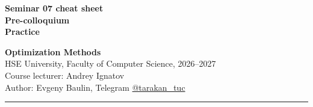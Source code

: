\documentclass[10pt,a4paper]{article}
\begin{document}
\thispagestyle{fancy}

\noindent
\begin{minipage}[b]{0.6\textwidth}
  \RaggedRight{}
  {\color{hseaccent}\bfseries\small Seminar 07 cheat sheet}\\[1pt]
  {\color{hseblue}\bfseries\Large Pre-colloquium\\ Practice}
\end{minipage}\hfill
\begin{minipage}[b]{0.39\textwidth}
  \raggedleft\footnotesize
  {\bfseries Optimization Methods}\\
  HSE University, Faculty of Computer Science, 2026--2027\\
  Course lecturer: Andrey Ignatov\\
  Author: Evgeny Baulin, Telegram \href{https://t.me/tarakan_tuc}{@tarakan\_tuc}
\end{minipage}

\vspace{2pt}
{\color{hseblue}\rule{\textwidth}{0.8pt}}
\vspace{-4pt}
\end{document}
